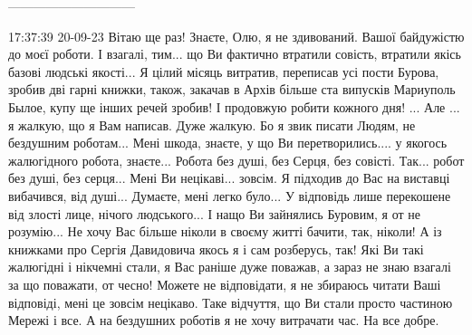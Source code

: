 ------------------------------

17:37:39 20-09-23
Вітаю ще раз! Знаєте, Олю, я не здивований. Вашої байдужістю до моєї роботи. І взагалі, тим... що Ви фактично втратили совість,
втратили якісь базові людські якості...	 Я цілий місяць витратив, переписав
усі пости Бурова, зробив дві гарні книжки, також, закачав в Архів більше ста випусків Мариуполь Былое, купу ще інших речей зробив!
І продовжую робити кожного дня! ... Але ... я жалкую, що я Вам написав. Дуже жалкую. Бо я звик писати Людям,
не бездушним роботам...
Мені шкода, знаєте, у що Ви перетворились.... у якогось жалюгідного робота, знаєте...
Робота без душі, без Серця, без совісті. Так... робот без душі, без серця... Мені Ви нецікаві... зовсім. Я підходив до Вас на виставці
вибачився, від душі... Думаєте, мені легко було...  У відповідь лише перекошене від злості лице, нічого людського...
І нащо Ви зайнялись Буровим, я от не розумію... Не хочу Вас більше ніколи в своєму житті бачити, так, ніколи!
А із книжками про Сергія Давидовича якось я і сам розберусь, так!
Які Ви такі жалюгідні і нікчемні стали, я Вас раніше дуже поважав, а зараз не знаю взагалі за що поважати, от чесно!
Можете не відповідати, я не збираюсь читати Ваші відповіді, мені це зовсім нецікаво.
Таке відчуття, що Ви стали просто частиною Мережі і все.
А на бездушних роботів я не хочу витрачати час.
На все добре.


